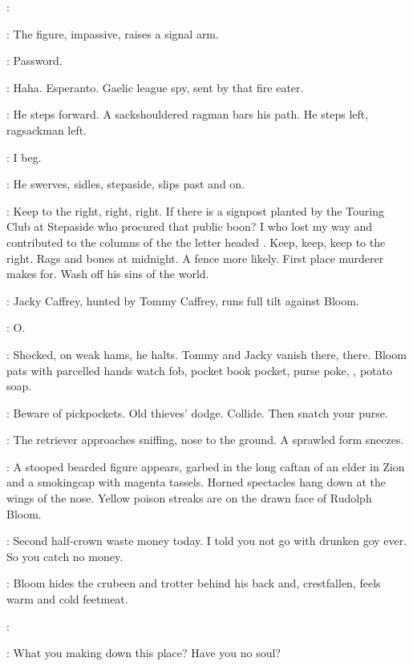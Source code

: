 \Bloom:

:
The figure,
impassive,
raises a signal arm.

\Figure:
Password.

\Bloom:
Haha.
Esperanto.
Gaelic league spy,
sent by that fire eater.

:
He steps forward.
A sackshouldered ragman bars his path.
He steps left,
ragsackman left.

\Bloom:
I beg.

:
He swerves,
sidles,
stepaside,
slips past and on.

\Bloom:
Keep to the right,
right,
right.
If there is a signpost planted by the Touring Club at Stepaside
who procured that public boon?
I who lost my way and contributed to the columns of the 
the letter headed .
Keep,
keep,
keep to the right.
Rags and bones at midnight.
A fence more likely.
First place murderer makes for.
Wash off his sins of the world.

:
Jacky Caffrey,
hunted by Tommy Caffrey,
runs full tilt against Bloom.

\Bloom:
O.

:
Shocked,
on weak hams,
he halts.
Tommy and Jacky vanish there,
there.
Bloom pats with parcelled hands watch fob,
pocket book pocket,
purse poke,
,
potato soap.

\Bloom:
Beware of pickpockets.
Old thieves' dodge.
Collide.
Then snatch your purse.

:
The retriever approaches sniffing,
nose to the ground.
A sprawled form sneezes.

:
A stooped bearded figure appears,
garbed in the long caftan of an elder in Zion
and a smokingcap with magenta tassels.
Horned spectacles hang down at the wings of the nose.
Yellow poison streaks are on the drawn face of Rudolph Bloom.

\Rudolph:
Second half-crown waste money today.
I told you not go with drunken goy ever.
So you catch no money.

:
Bloom hides the crubeen and trotter behind his back and,
crestfallen,
feels warm and cold feetmeat.

\Bloom:

\Rudolph:
What you making down this place?
Have you no soul?

